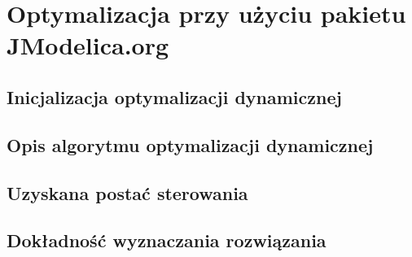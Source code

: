 \section{Optymalizacja przy użyciu pakietu JModelica.org}
\label{sec:opt}


\subsection{Inicjalizacja optymalizacji dynamicznej}
\label{sub:opt-init}


\subsection{Opis algorytmu optymalizacji dynamicznej}
\label{sub:opt-alg}


\subsection{Uzyskana postać sterowania}
\label{sub:opt-ctrl-form}


\subsection{Dokładność wyznaczania rozwiązania}
\label{sub:opt-dokladnosc}
